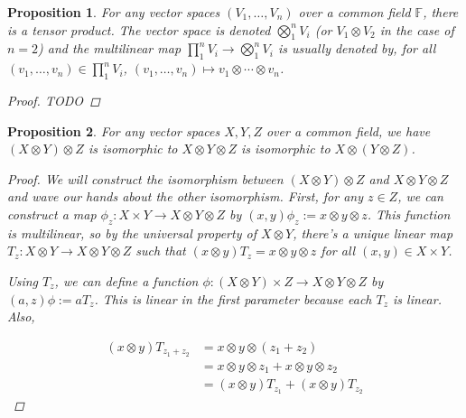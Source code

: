 \documentclass[a4paper,14pt]{article}
\newtheorem*{prop}{Proposition}
\begin{document}
\begin{prop}
For any vector spaces $(V_1, \ldots, V_n)$ over a common field $\mathbb{F}$, there is a tensor product. The vector space is denoted $\bigotimes_1^n V_i$ (or $V_1 \otimes V_2$ in the case of $n = 2$) and the multilinear map $\prod_1^n V_i \to \bigotimes_1^n V_i$ is usually denoted by, for all $(v_1, \ldots, v_n) \in \prod_1^n V_i$, $(v_1, \ldots, v_n) \mapsto v_1 \otimes \cdots \otimes v_n$.
\begin{proof}
TODO
\end{proof}
\end{prop}

\begin{prop}
For any vector spaces $X, Y, Z$ over a common field, we have $(X \otimes Y) \otimes Z$ is isomorphic to $X \otimes Y \otimes Z$ is isomorphic to $X \otimes (Y \otimes Z)$.
\begin{proof}
    We will construct the isomorphism between $(X \otimes Y) \otimes Z$ and $X \otimes Y \otimes Z$ and wave our hands about the other isomorphism. First, for any $z \in Z$, we can construct a map $\phi_z: X \times Y \to X \otimes Y \otimes Z$ by $(x, y) \phi_z := x \otimes y \otimes z$. This function is multilinear, so by the universal property of $X \otimes Y$, there's a unique linear map $T_z: X \otimes Y \to X \otimes Y \otimes Z$ such that $(x \otimes y ) T_z = x \otimes y \otimes z$ for all $(x, y) \in X \times Y$.

\begin{center}
\end{center}

Using $T_z$, we can define a function $\phi: (X \otimes Y) \times Z \to X \otimes Y \otimes Z$ by $(a, z) \phi := a T_z$. This is linear in the first parameter because each $T_z$ is linear. Also, 

\begin{align*}
(x \otimes y) T_{z_1 + z_2} & = x \otimes y \otimes (z_1 + z_2) \\
                            & = x \otimes y \otimes z_1 + x \otimes y \otimes z_2 \\
                            & = (x \otimes y) T_{z_1} + (x \otimes y) T_{z_2}
\end{align*}
    

\end{proof}
\end{prop}
\end{document}
